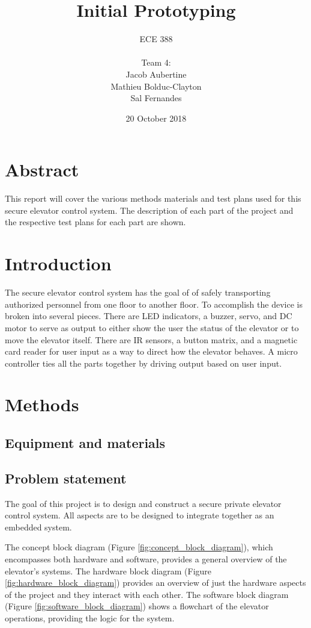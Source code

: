 \documentclass{article}
\title{Initial Prototyping}
\date{20 October 2018}
\author{
	ECE 388
	\\
	\\
	Team 4:
	\\
	Jacob Aubertine
	\\
	Mathieu Bolduc-Clayton
	\\
	Sal Fernandes
}
\begin{document}
	\maketitle
	\newpage
	\tableofcontents
	\newpage

    \section{Abstract}
    This report will cover the various methods materials and test plans used for this secure elevator control system. The description of each part of the project and the respective test plans for each part are shown.
    \section{Introduction}
    The secure elevator control system has the goal of of safely transporting authorized personnel from one floor to another floor. To accomplish the device is broken into several pieces. There are LED indicators, a buzzer, servo, and DC motor to serve as output to either show the user the status of the elevator or to move the elevator itself. There are IR sensors, a button matrix, and a magnetic card reader for user input as a way to direct how the elevator behaves. A micro controller ties all the parts together by driving output based on user input.
    \section{Methods}
        \subsection{Equipment and materials}
        
        
        \subsection{Problem statement}
	    The goal of this project is to design and construct a secure private elevator control system. All aspects are to be designed to integrate together as an embedded system. 
	
	
    	The concept block diagram (Figure \ref{fig:concept_block_diagram}), which encompasses both hardware and software, provides a general overview of the elevator's systems. The hardware block diagram (Figure \ref{fig:hardware_block_diagram}) provides an overview of just the hardware aspects of the project and they interact with each other. The software block diagram (Figure \ref{fig:software_block_diagram}) shows a flowchart of the elevator operations, providing the logic for the system.
	
\end{document}
